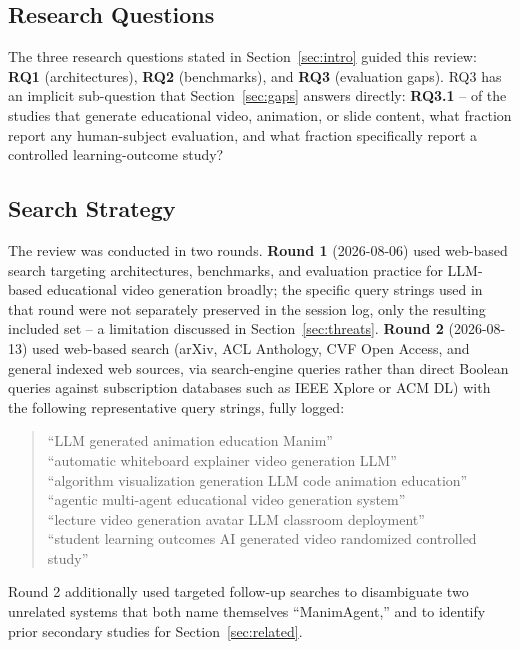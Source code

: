 \documentclass[journal]{IEEEtran}
\begin{document}
\subsection{Research Questions}

The three research questions stated in Section~\ref{sec:intro} guided this review: \textbf{RQ1} (architectures), \textbf{RQ2} (benchmarks), and \textbf{RQ3} (evaluation gaps). RQ3 has an implicit sub-question that Section~\ref{sec:gaps} answers directly: \textbf{RQ3.1} -- of the studies that generate educational video, animation, or slide content, what fraction report any human-subject evaluation, and what fraction specifically report a controlled learning-outcome study?

\subsection{Search Strategy}

The review was conducted in two rounds. \textbf{Round 1} (2026-08-06) used web-based search targeting architectures, benchmarks, and evaluation practice for LLM-based educational video generation broadly; the specific query strings used in that round were not separately preserved in the session log, only the resulting included set -- a limitation discussed in Section~\ref{sec:threats}. \textbf{Round 2} (2026-08-13) used web-based search (arXiv, ACL Anthology, CVF Open Access, and general indexed web sources, via search-engine queries rather than direct Boolean queries against subscription databases such as IEEE Xplore or ACM DL) with the following representative query strings, fully logged:

\begin{quotation}
\ttfamily\small
``LLM generated animation education Manim''\\
``automatic whiteboard explainer video generation LLM''\\
``algorithm visualization generation LLM code animation education''\\
``agentic multi-agent educational video generation system''\\
``lecture video generation avatar LLM classroom deployment''\\
``student learning outcomes AI generated video randomized controlled study''
\end{quotation}

Round 2 additionally used targeted follow-up searches to disambiguate two unrelated systems that both name themselves ``ManimAgent,'' and to identify prior secondary studies for Section~\ref{sec:related}.
\end{document}

